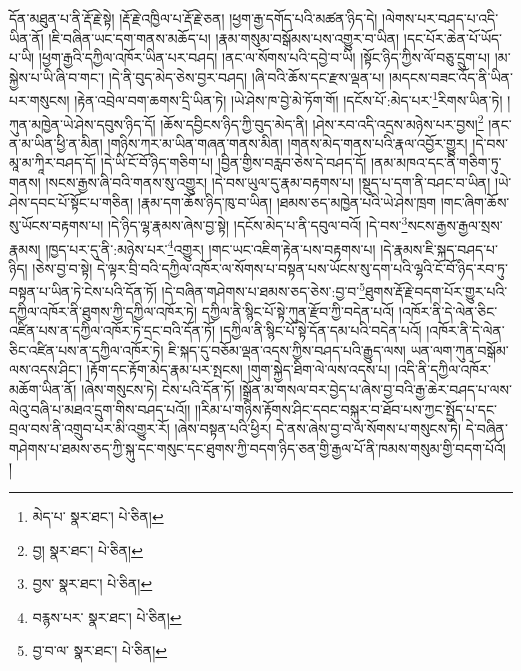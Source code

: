 དོན་མཐུན་པ་ནི་རྡོ་རྗེ་སྟེ། །རྡོ་རྗེ་འཁྱིལ་པ་རྡོ་རྗེ་ཅན། །ཕྱག་རྒྱ་དགོད་པའི་མཚན་ཉིད་དེ། །ལེགས་པར་བཤད་པ་འདི་ཡིན་ནོ། །ཇི་བཞིན་ཡང་དག་གནས་མཆོད་པ། །རྣམ་གསུམ་བསྒོམས་པས་འགྱུར་བ་ཡིན། །དང་པོར་ཆེན་པོ་ཡོད་པ་ཡི། །ཕྱག་རྒྱའི་དཀྱིལ་འཁོར་ཡིན་པར་བཤད། །ནང་ལ་སོགས་པའི་དབྱེ་བ་ཡི། །སྟོང་ཉིད་ཀྱིས་ལོ་བཅུ་དྲུག་པ། །མ་སྐྱེས་པ་ཡི་ཞི་བ་གང་། །དེ་ནི་བུད་མེད་ཅེས་བྱར་བཤད། །ཞི་བའི་ཆོས་དང་རྫས་ལྡན་པ། །མདངས་བཟང་འོད་ནི་ཡིན་པར་གསུངས། །རྟེན་འབྲེལ་བག་ཆགས་དྲི་ཡིན་ཏེ། །ཡེ་ཤེས་ཁ་བྱེ་མེ་ཏོག་གོ། །དངོས་པོ་:མེད་པར་\footnote{མེད་པ་  སྣར་ཐང་།  པེ་ཅིན། }རིགས་ཡིན་ཏེ། །ཀུན་མཁྱེན་ཡེ་ཤེས་དབུས་ཉིད་དོ། །ཆོས་དབྱིངས་ཉིད་ཀྱི་བུད་མེད་ནི། །ཤེས་རབ་འདི་འདྲས་མཉེས་པར་བྱས།\footnote{བྱ།  སྣར་ཐང་།  པེ་ཅིན། } །ནང་ན་མ་ཡིན་ཕྱི་ན་མིན། །གཉིས་ཀར་མ་ཡིན་གཞན་གནས་མིན། །གནས་མེད་གནས་པའི་རྣལ་འབྱོར་གྱུར། །དེ་བས་མཱ་མ་ཀཱིར་བཤད་དོ། །དེ་ཡི་ངོ་བོ་ཉིད་གཅིག་པ། །བྱིན་གྱིས་བརླབ་ཅེས་དེ་བཤད་དོ། །ནམ་མཁའ་དང་ནི་གཅིག་ཏུ་གནས། །སངས་རྒྱས་ཞི་བའི་གནས་སུ་འགྱུར། །དེ་བས་ཡུལ་དུ་རྣམ་བརྟགས་པ། །སྡུད་པ་དག་ནི་བཤང་བ་ཡིན། །ཡེ་ཤེས་དབང་པོ་སྟོང་པ་གཅིན། །རྣམ་དག་ཆོས་ཉིད་ཁུ་བ་ཡིན། །ཐམས་ཅད་མཁྱེན་པའི་ཡེ་ཤེས་ཁྲག །གང་ཞིག་ཆོས་སུ་ཡོངས་བརྟགས་པ། །དེ་ཉིད་ལྷ་རྣམས་ཞེས་བྱ་སྟེ། །དངོས་མེད་པ་ནི་དབུལ་བའོ། །དེ་བས་\footnote{བྱས་  སྣར་ཐང་།  པེ་ཅིན། }སངས་རྒྱས་རྒྱལ་སྲས་རྣམས། །ཁྱད་པར་དུ་ནི་:མཉེས་པར་\footnote{བརྙས་པར་  སྣར་ཐང་།  པེ་ཅིན། }འགྱུར། །གང་ཡང་འཇིག་རྟེན་པས་བརྟགས་པ། །དེ་རྣམས་ཇི་སྐད་བཤད་པ་ཉིད། །ཅེས་བྱ་བ་སྟེ། དེ་ལྟར་བྲི་བའི་དཀྱིལ་འཁོར་ལ་སོགས་པ་བསྟན་པས་ཡོངས་སུ་དག་པའི་ལྷའི་ངོ་བོ་ཉིད་རབ་ཏུ་བསྟན་པ་ཡིན་ཏེ་ངེས་པའི་དོན་ཏོ། །དེ་བཞིན་གཤེགས་པ་ཐམས་ཅད་ཅེས་:བྱ་བ་\footnote{བྱ་བ་ལ་  སྣར་ཐང་།  པེ་ཅིན། }ཐུགས་རྡོ་རྗེ་བདག་པོར་གྱུར་པའི་དཀྱིལ་འཁོར་ནི་ཐུགས་ཀྱི་དཀྱིལ་འཁོར་ཏེ། དཀྱིལ་ནི་སྙིང་པོ་སྟེ་ཀུན་རྫོབ་ཀྱི་བདེན་པའོ། །འཁོར་ནི་དེ་ལེན་ཅིང་འཛིན་པས་ན་དཀྱིལ་འཁོར་ཏེ་དྲང་བའི་དོན་ཏོ། །དཀྱིལ་ནི་སྙིང་པོ་སྟེ་དོན་དམ་པའི་བདེན་པའོ། །འཁོར་ནི་དེ་ལེན་ཅིང་འཛིན་པས་ན་དཀྱིལ་འཁོར་ཏེ། ཇི་སྐད་དུ་བཅོམ་ལྡན་འདས་ཀྱིས་བཤད་པའི་རྒྱུད་ལས། ཡན་ལག་ཀུན་བསྒོམ་ལས་འདས་ཤིང་། །རྟོག་དང་རྟོག་མེད་རྣམ་པར་སྤངས། །གུག་སྐྱེད་ཐིག་ལེ་ལས་འདས་པ། །འདི་ནི་དཀྱིལ་འཁོར་མཆོག་ཡིན་ནོ། །ཞེས་གསུངས་ཏེ། ངེས་པའི་དོན་ཏོ། །སྒྲོན་མ་གསལ་བར་བྱེད་པ་ཞེས་བྱ་བའི་རྒྱ་ཆེར་བཤད་པ་ལས་ལེའུ་བཞི་པ་མཐའ་དྲུག་གིས་བཤད་པའོ།། །།རིམ་པ་གཉིས་རྟོགས་ཤིང་དབང་བསྐུར་བ་ཐོབ་པས་ཀྱང་སྤྱོད་པ་དང་བྲལ་བས་ནི་འགྲུབ་པར་མི་འགྱུར་རོ། །ཞེས་བསྟན་པའི་ཕྱིར། དེ་ནས་ཞེས་བྱ་བ་ལ་སོགས་པ་གསུངས་ཏེ། དེ་བཞིན་གཤེགས་པ་ཐམས་ཅད་ཀྱི་སྐུ་དང་གསུང་དང་ཐུགས་ཀྱི་བདག་ཉིད་ཅན་གྱི་རྒྱལ་པོ་ནི་ཁམས་གསུམ་གྱི་བདག་པོའོ། །
